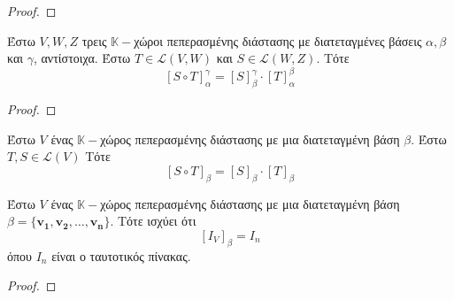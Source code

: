 \begin{proof}
\end{proof}

\begin{thm}
  Έστω $ V,W,Z $ τρεις $ \mathbb{K}- $χώροι πεπερασμένης διάστασης με διατεταγμένες 
  βάσεις $ \alpha, \beta $ και $\gamma$, αντίστοιχα. Έστω $ T \in \mathcal{L}(V,W) $ 
  και $ S \in \mathcal{L}(W,Z) $. Τότε
  \[
    [S \circ T]_{\alpha}^{\gamma} = [S]_{\beta}^{\gamma} \cdot [T]_{\alpha}^{\beta}
  \] 
\end{thm}

\begin{proof}
\end{proof}

\begin{cor}
  Έστω $V$ ένας $ \mathbb{K}- $χώρος πεπερασμένης διάστασης με μια διατεταγμένη βάση 
  $\beta$. Έστω $ T,S \in \mathcal{L}(V) $ Τότε
  \[
    [S \circ T]_{\beta} = [S]_{\beta} \cdot [T]_{\beta}
  \] 
\end{cor}

\begin{thm}
  Έστω $V$ ένας $ \mathbb{K}- $χώρος πεπερασμένης διάστασης με μια διατεταγμένη βάση 
  $ \beta = \{ \mathbf{v_{1}}, \mathbf{v_{2}}, \ldots, \mathbf{v_{n}} \} $. Τότε 
  ισχύει ότι 
  \[
    [I_{V}]_{\beta} = I_{n}
  \] 
  όπου $ I_{n} $ είναι ο ταυτοτικός πίνακας.
\end{thm}

\begin{proof}
\end{proof}

